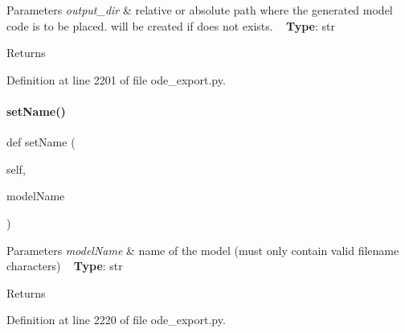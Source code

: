 \begin{DoxyParams}{Parameters}
{\em output\+\_\+dir} & relative or absolute path where the generated model code is to be placed. will be created if does not exists. ~\newline
{\bfseries Type}\+: str\\
\hline
\end{DoxyParams}
\begin{DoxyReturn}{Returns}

\end{DoxyReturn}


Definition at line 2201 of file ode\+\_\+export.\+py.

\mbox{\label{classamici_1_1ode__export_1_1_o_d_e_exporter_af9ec4a20beb62b41663733ecfc8e1713}} 
\paragraph{\texorpdfstring{set\+Name()}{setName()}}
{\footnotesize\ttfamily def set\+Name (\begin{DoxyParamCaption}\item[{}]{self,  }\item[{}]{model\+Name }\end{DoxyParamCaption})}


\begin{DoxyParams}{Parameters}
{\em model\+Name} & name of the model (must only contain valid filename characters) ~\newline
{\bfseries Type}\+: str\\
\hline
\end{DoxyParams}
\begin{DoxyReturn}{Returns}

\end{DoxyReturn}


Definition at line 2220 of file ode\+\_\+export.\+py.

